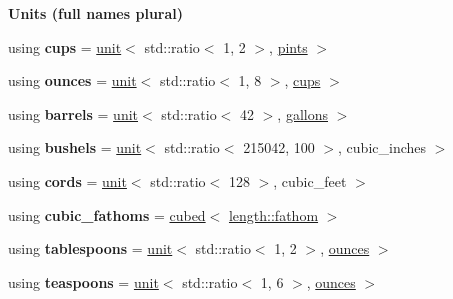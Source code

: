 \begin{Indent}{\bf Units (full names plural)}
\begin{DoxyCompactItemize}
\item 
\hypertarget{namespaceunits_1_1volume_a7c2b2aad99c308f5d180b65c8bda5396}{}using {\bfseries cups} = \hyperlink{structunits_1_1unit}{unit}$<$ std\+::ratio$<$ 1, 2 $>$, \hyperlink{structunits_1_1unit}{pints} $>$\label{namespaceunits_1_1volume_a7c2b2aad99c308f5d180b65c8bda5396}

\item 
\hypertarget{namespaceunits_1_1volume_a48e8014788a6ede71884fc94b530491a}{}using {\bfseries ounces} = \hyperlink{structunits_1_1unit}{unit}$<$ std\+::ratio$<$ 1, 8 $>$, \hyperlink{structunits_1_1unit}{cups} $>$\label{namespaceunits_1_1volume_a48e8014788a6ede71884fc94b530491a}

\item 
\hypertarget{namespaceunits_1_1volume_a84ab493c1bdf4fc93dc6d33154a624c2}{}using {\bfseries barrels} = \hyperlink{structunits_1_1unit}{unit}$<$ std\+::ratio$<$ 42 $>$, \hyperlink{structunits_1_1unit}{gallons} $>$\label{namespaceunits_1_1volume_a84ab493c1bdf4fc93dc6d33154a624c2}

\item 
\hypertarget{namespaceunits_1_1volume_a259f911d12dcc4903659d41111bfb885}{}using {\bfseries bushels} = \hyperlink{structunits_1_1unit}{unit}$<$ std\+::ratio$<$ 215042, 100 $>$, cubic\+\_\+inches $>$\label{namespaceunits_1_1volume_a259f911d12dcc4903659d41111bfb885}

\item 
\hypertarget{namespaceunits_1_1volume_a12b32c5dbbed4dc0fcee534b82d305b7}{}using {\bfseries cords} = \hyperlink{structunits_1_1unit}{unit}$<$ std\+::ratio$<$ 128 $>$, cubic\+\_\+feet $>$\label{namespaceunits_1_1volume_a12b32c5dbbed4dc0fcee534b82d305b7}

\item 
\hypertarget{namespaceunits_1_1volume_ae05bf2f602251bc9c203f3f36e83b2a9}{}using {\bfseries cubic\+\_\+fathoms} = \hyperlink{group___unit_manipulators_gad3e94dc693fe45a580b382cb666434a1}{cubed}$<$ \hyperlink{structunits_1_1unit}{length\+::fathom} $>$\label{namespaceunits_1_1volume_ae05bf2f602251bc9c203f3f36e83b2a9}

\item 
\hypertarget{namespaceunits_1_1volume_ae038698af8b5d147137067354ab7d986}{}using {\bfseries tablespoons} = \hyperlink{structunits_1_1unit}{unit}$<$ std\+::ratio$<$ 1, 2 $>$, \hyperlink{structunits_1_1unit}{ounces} $>$\label{namespaceunits_1_1volume_ae038698af8b5d147137067354ab7d986}

\item 
\hypertarget{namespaceunits_1_1volume_a6e5bce9bbe1d9a38b19bae9c74a1bbeb}{}using {\bfseries teaspoons} = \hyperlink{structunits_1_1unit}{unit}$<$ std\+::ratio$<$ 1, 6 $>$, \hyperlink{structunits_1_1unit}{ounces} $>$\label{namespaceunits_1_1volume_a6e5bce9bbe1d9a38b19bae9c74a1bbeb}


\end{DoxyCompactItemize}
\end{Indent}
